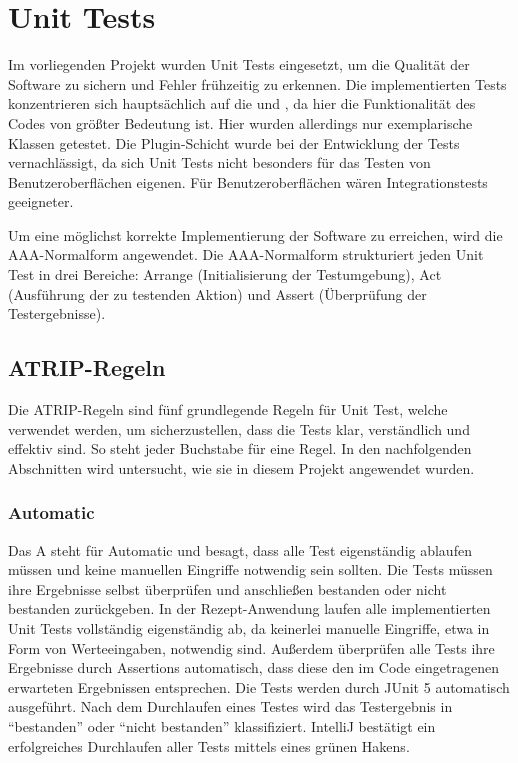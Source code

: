 \chapter{Unit Tests}

Im vorliegenden Projekt wurden Unit Tests eingesetzt, um die Qualität der Software zu sichern und Fehler frühzeitig zu erkennen. Die implementierten Tests konzentrieren sich hauptsächlich auf die \href{https://github.com/MichaelaHaag/RezeptApp/blob/main/3-Domain-Code/src/test/java/de/rezeptapp/domain/Rezept}{} und \href{https://github.com/MichaelaHaag/RezeptApp/tree/main/1-Adapter/src/test/java/de/rezeptapp/adapter/Datenpersistenz}{}, da hier die Funktionalität des Codes von größter Bedeutung ist. Hier wurden allerdings nur exemplarische Klassen getestet. Die Plugin-Schicht wurde bei der Entwicklung der Tests vernachlässigt, da sich Unit Tests nicht besonders für das Testen von Benutzeroberflächen eigenen. Für Benutzeroberflächen wären Integrationstests geeigneter.

Um eine möglichst korrekte Implementierung der Software zu erreichen, wird die AAA-Normalform angewendet. Die AAA-Normalform strukturiert jeden Unit Test in drei Bereiche: Arrange (Initialisierung der Testumgebung), Act (Ausführung der zu testenden Aktion) und Assert (Überprüfung der Testergebnisse).

\section{ATRIP-Regeln}

Die ATRIP-Regeln sind fünf grundlegende Regeln für Unit Test, welche verwendet werden, um sicherzustellen, dass die Tests klar, verständlich und effektiv sind. So steht jeder Buchstabe für eine Regel. In den nachfolgenden Abschnitten wird untersucht, wie sie in diesem Projekt angewendet wurden.

\subsection{Automatic}
Das A steht für Automatic und besagt, dass alle Test eigenständig ablaufen müssen und keine manuellen Eingriffe notwendig sein sollten. Die Tests müssen ihre Ergebnisse selbst überprüfen und anschließen bestanden oder nicht bestanden zurückgeben. In der Rezept-Anwendung laufen alle implementierten Unit Tests vollständig eigenständig ab, da keinerlei manuelle Eingriffe, etwa in Form von Werteeingaben, notwendig sind. Außerdem überprüfen alle Tests ihre Ergebnisse durch Assertions automatisch, dass diese den im Code eingetragenen erwarteten Ergebnissen entsprechen. Die Tests werden durch JUnit 5 automatisch ausgeführt. Nach dem Durchlaufen eines Testes wird das Testergebnis in \enquote{bestanden} oder \enquote{nicht bestanden} klassifiziert. IntelliJ bestätigt ein erfolgreiches Durchlaufen aller Tests mittels eines grünen Hakens.

